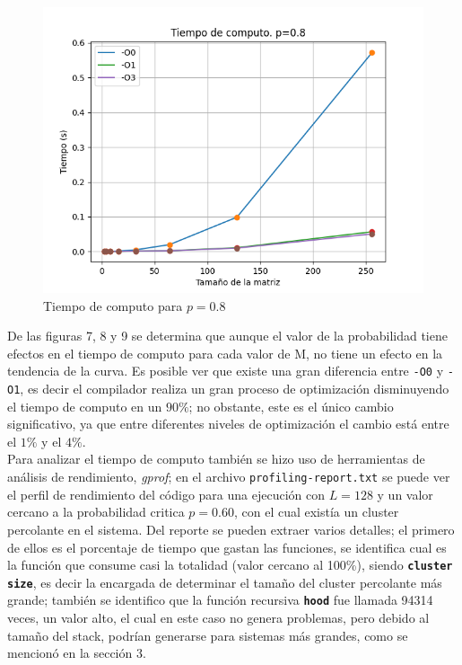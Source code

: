 \documentclass[11pt,twocolumn]{article}
\begin{document}
\begin{figure}
    \includegraphics[width=1\linewidth]{Imagenes/Computing_time_p08.png}
    \caption{Tiempo de computo para $p=0.8$}
    \label{fig:Comptime08}
\end{figure}

\vspace{0.2cm}
De las figuras 7, 8 y 9 se determina que aunque el valor de la probabilidad tiene efectos en el tiempo de computo para cada valor de M, no tiene un efecto en la tendencia de la curva. Es posible ver que existe una gran diferencia entre \texttt{-O0} y \texttt{-O1}, es decir el compilador realiza un gran proceso de optimización disminuyendo el tiempo de computo en un $90\%$; no obstante, este es el único cambio significativo, ya que entre diferentes niveles de optimización el cambio está entre el $1\%$ y el $4\%$.\\
Para analizar el tiempo de computo también se hizo uso de herramientas de análisis de rendimiento, \textit{gprof}; en el archivo \texttt{profiling-report.txt} se puede ver el perfil de rendimiento del código para una ejecución con $L=128$ y un valor cercano a la probabilidad critica $p=0.60$, con el cual existía un cluster percolante en el sistema. Del reporte se pueden extraer varios detalles; el primero de ellos es el porcentaje de tiempo que gastan las funciones, se identifica cual es la función que consume casi la totalidad (valor cercano al 100\%), siendo \texttt{\textbf{cluster size}}, es decir la encargada de determinar el tamaño del cluster percolante más grande; también se identifico que la función recursiva \texttt{\textbf{hood}} fue llamada 94314 veces, un valor alto, el cual en este caso no genera problemas, pero debido al tamaño del stack, podrían generarse para sistemas más grandes, como se mencionó en la sección 3.
\end{document}
